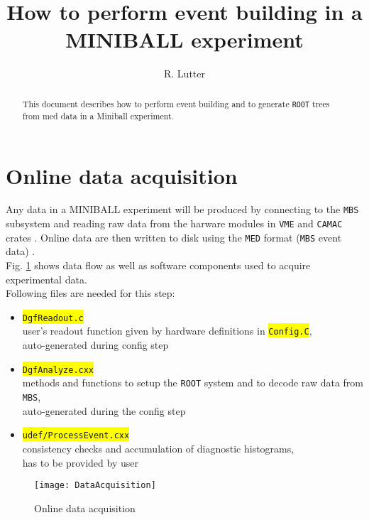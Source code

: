 \documentclass[10pt]{article}
\newcommand{\yellow}[1]{\colorbox{yellow}{\texttt{#1}}}
\begin{document}
\begin{titlepage}
\title{How to perform event building in a MINIBALL experiment}
\author{R. Lutter}
\maketitle
\vfill
\begin{abstract}
\setlength{\parindent}{0pt}
\begin{center}
This document describes how to perform event building and to generate \texttt{ROOT} trees from med data in a \mbox{Miniball} experiment.
\end{center}
\end{abstract}
\vfill
\end{titlepage}
\newpage
\tableofcontents
\newpage
\section{Online data acquisition}\label{OnlineDataAcquisition}
Any data in a MINIBALL experiment will be produced by connecting to the \texttt{MBS} subsystem and reading raw data from the harware modules
in \texttt{VME} and \texttt{CAMAC} crates \cite{DaqInstructions}.
Online data are then written to disk using the \texttt{MED} format (\texttt{MBS} event data) \cite{MedStructure}.\\
Fig. \ref{DataAcquisition} shows data flow as well as software components used to acquire experimental data.\\

Following files are needed for this step:
\begin{center}
\begin{itemize}
\setlength{\rightmargin}{1em}%
\setlength{\leftmargin}{2em}%
\setlength{\itemsep}{0pt}%
\setlength{\parskip}{1mm}%
\setlength{\partopsep}{0pt}%
\setlength{\parsep}{0pt}%
\setlength{\topsep}{0pt}%
\item	\yellow{DgfReadout.c}\\
	user's readout function given by hardware definitions in \yellow{Config.C},\\
	auto-generated during config step
\item	\yellow{DgfAnalyze.cxx}\\
	methods and functions to setup the \texttt{ROOT} system and to decode raw data from \texttt{MBS},\\
	auto-generated during the config step
\item	\yellow{udef/ProcessEvent.cxx}\\
	consistency checks and accumulation of diagnostic histograms,\\
	has to be provided by user
\end{itemize}
\end{center}
\begin{figure}[H]
\centerline{\texttt{[image: DataAcquisition]}}
\caption{Online data acquisition}
\label{DataAcquisition}
\end{figure}
\newpage
\end{document}
